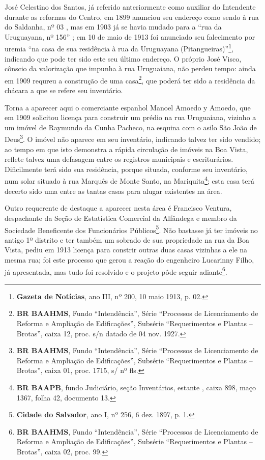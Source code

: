 José Celestino dos Santos, já referido anteriormente como auxiliar do Intendente durante as reformas do Centro, em 1899 anunciou seu endereço como sendo à rua do Saldanha, nº 03 \cite[p.~477]{almanak_1899}, mas em 1903 já se havia mudado para a ``rua da Uruguayana, nº 156'' \cite[p.~345]{reis_almanak_1903}; em 10 de maio de 1913 foi anunciado seu falecimento por uremia ``na casa de sua residência à rua da Uruguayana (Pitangueiras)''\footnote{\textbf{Gazeta de Notícias}, ano III, nº 200, 10 maio 1913, p. 02.}, indicando que pode ter sido este seu último endereço. O próprio José Visco, cônscio da valorização que impunha à rua Uruguaiana, não perdeu tempo: ainda em 1909 requreu a construção de uma casa\footnote{\textbf{BR BAAHMS}, Fundo ``Intendência'', Série ``Processos de Licenciamento de Reforma e Ampliação de Edificações'', Subsérie ``Requerimentos e Plantas -- Brotas'', caixa 12, proc. s/n datado de 04 nov. 1927.}, que poderá ter sido a residência da chácara a que se refere seu inventário.

Torna a aparecer aqui o comerciante espanhol Manoel Amoedo y Amoedo, que em 1909 solicitou licença para construir um prédio na rua Uruguaiana, vizinho a um imóvel de Raymundo da Cunha Pacheco, na esquina com o asilo São João de Deus\footnote{\textbf{BR BAAHMS}, Fundo ``Intendência'', Série ``Processos de Licenciamento de Reforma e Ampliação de Edificações'', Subsérie ``Requerimentos e Plantas -- Brotas'', caixa 01, proc. 1715, s/ nº fls.}. O imóvel não aparece em seu inventário, indicando talvez ter sido vendido; ao tempo em que isto demonstra a rápida circulação de imóveis na Boa Vista, reflete talvez uma defasagem entre os registros municipais e escriturários. Dificilmente terá sido sua residência, porque situada, conforme seu inventário, num solar situado à rua Marquês de Monte Santo, na Mariquita\footnote{\textbf{BR BAAPB}, fundo Judiciário, seção Inventários, estante , caixa 898, maço 1367, folha 42, documento 13.}; esta casa terá decerto sido uma entre as tantas casas para alugar existentes na área.

Outro requerente de destaque a aparecer nesta área é Francisco Ventura, despachante da Seção de Estatística Comercial da Alfândega \cite[p.~307]{reis_almanak_1898} e membro da Sociedade Beneficente dos Funcionários Públicos\footnote{\textbf{Cidade do Salvador}, ano I, nº 256, 6 dez. 1897, p. 1.}. Não bastasse já ter imóveis no antigo 1º distrito e ter também um sobrado de sua propriedade na rua da Boa Vista, pediu em 1913 licença para constrir outras duas casas vizinhas a ele na mesma rua; foi este processo que gerou a reação do engenheiro Lucarinny Filho, já apresentada, mas tudo foi resolvido e o projeto pôde seguir adiante\footnote{\textbf{BR BAAHMS}, Fundo ``Intendência'', Série ``Processos de Licenciamento de Reforma e Ampliação de Edificações'', Subsérie ``Requerimentos e Plantas -- Brotas'', caixa 02, proc. 99.}.

